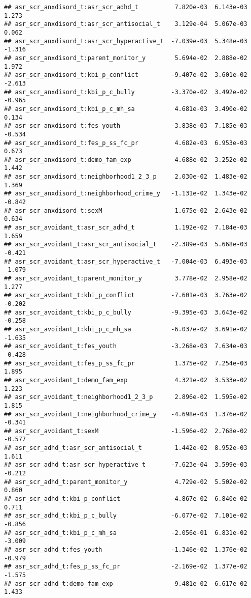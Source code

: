 \documentclass[
]{article}
\begin{document}
\begin{verbatim}
## asr_scr_anxdisord_t:asr_scr_adhd_t          7.820e-03  6.143e-03   1.273
## asr_scr_anxdisord_t:asr_scr_antisocial_t    3.129e-04  5.067e-03   0.062
## asr_scr_anxdisord_t:asr_scr_hyperactive_t  -7.039e-03  5.348e-03  -1.316
## asr_scr_anxdisord_t:parent_monitor_y        5.694e-02  2.888e-02   1.972
## asr_scr_anxdisord_t:kbi_p_conflict         -9.407e-02  3.601e-02  -2.613
## asr_scr_anxdisord_t:kbi_p_c_bully          -3.370e-02  3.492e-02  -0.965
## asr_scr_anxdisord_t:kbi_p_c_mh_sa           4.681e-03  3.490e-02   0.134
## asr_scr_anxdisord_t:fes_youth              -3.838e-03  7.185e-03  -0.534
## asr_scr_anxdisord_t:fes_p_ss_fc_pr          4.682e-03  6.953e-03   0.673
## asr_scr_anxdisord_t:demo_fam_exp            4.688e-02  3.252e-02   1.442
## asr_scr_anxdisord_t:neighborhood1_2_3_p     2.030e-02  1.483e-02   1.369
## asr_scr_anxdisord_t:neighborhood_crime_y   -1.131e-02  1.343e-02  -0.842
## asr_scr_anxdisord_t:sexM                    1.675e-02  2.643e-02   0.634
## asr_scr_avoidant_t:asr_scr_adhd_t           1.192e-02  7.184e-03   1.659
## asr_scr_avoidant_t:asr_scr_antisocial_t    -2.389e-03  5.668e-03  -0.421
## asr_scr_avoidant_t:asr_scr_hyperactive_t   -7.004e-03  6.493e-03  -1.079
## asr_scr_avoidant_t:parent_monitor_y         3.778e-02  2.958e-02   1.277
## asr_scr_avoidant_t:kbi_p_conflict          -7.601e-03  3.763e-02  -0.202
## asr_scr_avoidant_t:kbi_p_c_bully           -9.395e-03  3.643e-02  -0.258
## asr_scr_avoidant_t:kbi_p_c_mh_sa           -6.037e-02  3.691e-02  -1.635
## asr_scr_avoidant_t:fes_youth               -3.268e-03  7.634e-03  -0.428
## asr_scr_avoidant_t:fes_p_ss_fc_pr           1.375e-02  7.254e-03   1.895
## asr_scr_avoidant_t:demo_fam_exp             4.321e-02  3.533e-02   1.223
## asr_scr_avoidant_t:neighborhood1_2_3_p      2.896e-02  1.595e-02   1.815
## asr_scr_avoidant_t:neighborhood_crime_y    -4.698e-03  1.376e-02  -0.341
## asr_scr_avoidant_t:sexM                    -1.596e-02  2.768e-02  -0.577
## asr_scr_adhd_t:asr_scr_antisocial_t         1.442e-02  8.952e-03   1.611
## asr_scr_adhd_t:asr_scr_hyperactive_t       -7.623e-04  3.599e-03  -0.212
## asr_scr_adhd_t:parent_monitor_y             4.729e-02  5.502e-02   0.860
## asr_scr_adhd_t:kbi_p_conflict               4.867e-02  6.840e-02   0.711
## asr_scr_adhd_t:kbi_p_c_bully               -6.077e-02  7.101e-02  -0.856
## asr_scr_adhd_t:kbi_p_c_mh_sa               -2.056e-01  6.831e-02  -3.009
## asr_scr_adhd_t:fes_youth                   -1.346e-02  1.376e-02  -0.979
## asr_scr_adhd_t:fes_p_ss_fc_pr              -2.169e-02  1.377e-02  -1.575
## asr_scr_adhd_t:demo_fam_exp                 9.481e-02  6.617e-02   1.433

\end{verbatim}
\end{document}
